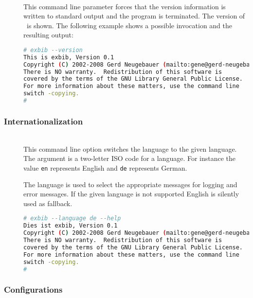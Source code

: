 \begin{description}
\item[]\ \\
  This command line parameter forces that the version information is
  written to standard output and the program is
  terminated. The version of \ExBib\ is shown. The
  following example shows a possible invocation and the resulting
  output:
\begin{lstlisting}[language=sh]
# exbib --version
This is exbib, Version 0.1
Copyright (C) 2002-2008 Gerd Neugebauer (mailto:gene@gerd-neugebauer.de).
There is NO warranty.  Redistribution of this software is
covered by the terms of the GNU Library General Public License.
For more information about these matters, use the command line
switch -copying.
#
\end{lstlisting}
\end{description}


\subsubsection{Internationalization}

\begin{description}
\item[ ]
\item[ ]\ \\
  This command line option switches the language to the given
  language. The argument is a two-letter ISO code for a language. For
  instance the value \texttt{en} represents English and \texttt{de}
  represents German.

  The language is used to select the appropriate messages for logging
  and error messages. If the given language is not supported English
  is silently used as fallback.
\begin{lstlisting}[language=sh]
# exbib --language de --help
Dies ist exbib, Version 0.1
Copyright (C) 2002-2008 Gerd Neugebauer (mailto:gene@gerd-neugebauer.de).
There is NO warranty.  Redistribution of this software is
covered by the terms of the GNU Library General Public License.
For more information about these matters, use the command line
switch -copying.
#
\end{lstlisting}
\end{description}


\subsubsection{Configurations}%
\label{sec:cli.cfg}%

